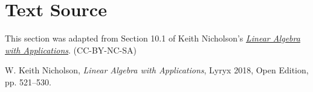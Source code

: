 \documentclass{ximera}
\begin{document}
\section*{Text Source} This section was adapted from Section 10.1 of Keith Nicholson's \href{https://open.umn.edu/opentextbooks/textbooks/linear-algebra-with-applications}{\it Linear Algebra with Applications}. (CC-BY-NC-SA)

W. Keith Nicholson, {\it Linear Algebra with Applications}, Lyryx 2018, Open Edition, pp. 521--530.
\end{document}
